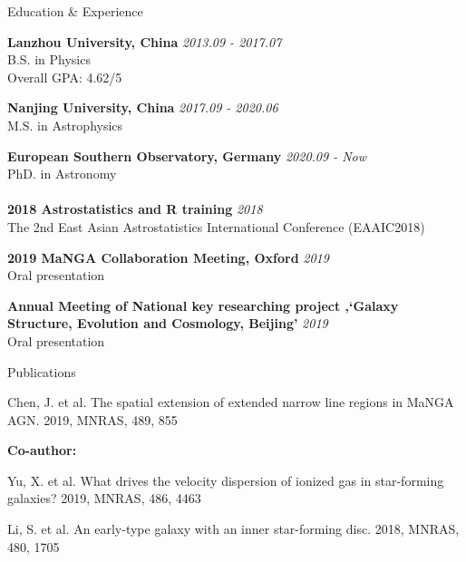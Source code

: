 \documentclass{resume} %
\begin{document}
\begin{rSection}{Education \& Experience}

{\bf Lanzhou University, China} \hfill {\em 2013.09 - 2017.07} \\ 
B.S. in Physics \\
Overall GPA: 4.62/5

{\bf Nanjing University, China} \hfill {\em 2017.09 - 2020.06} \\ 
M.S. in Astrophysics

{\bf European Southern Observatory, Germany} \hfill {\em 2020.09 - Now} \\
PhD. in Astronomy\\
\\

{\bf 2018 Astrostatistics and R training} \hfill {\em 2018} \\
The 2nd East Asian Astrostatistics International Conference (EAAIC2018)

{\bf 2019 MaNGA Collaboration Meeting, Oxford} \hfill {\em 2019}\\
Oral presentation

{\bf Annual Meeting of National key researching project ‚`Galaxy Structure, Evolution and Cosmology, Beijing'} \hfill {\em 2019} \\
Oral presentation


\end{rSection}

\begin{rSection}{Publications}

Chen, J. et al. The spatial extension of extended narrow line regions in MaNGA AGN. 2019, MNRAS, 489, 855

{\bf Co-author:}
	

  Yu, X. et al. What drives the velocity dispersion of ionized gas in star-forming galaxies? 2019, MNRAS, 486, 4463

  Li, S. et al. An early-type galaxy with an inner star-forming disc. 2018, MNRAS, 480, 1705

\end{rSection}
\end{document}
